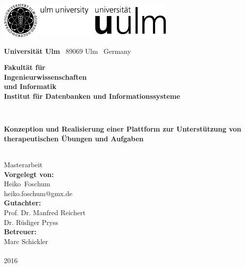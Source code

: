 \documentclass[a4paper,10pt,twoside,openright,DIV=15,BCOR25mm
]{scrbook}
\makeatletter
\newcommand{\fullname}{Heiko~Foschum}
\newcommand{\email}{heiko.foschum@gmx.de}
\newcommand{\titel}{Konzeption und Realisierung  einer \newline Plattform zur Unterstützung von \newline therapeutischen Übungen \newline und Aufgaben}
\newcommand{\jahr}{2016}
\newcommand{\gutachterA}{Prof. Dr. Manfred Reichert}
\newcommand{\gutachterB}{Dr. Rüdiger Pryss}
\newcommand{\betreuer}{Marc Schickler}
\newcommand{\fakultaet}{Ingenieurwissenschaften\\und Informatik}
\newcommand{\institut}{Institut für Datenbanken und Informationssysteme}
\makeatother
\begin{document}
\frontmatter


\thispagestyle{empty}
\begin{addmargin*}[4mm]{-10mm}

\includegraphics[height=1.8cm]{images/unilogo_bild}
\hfill
\includegraphics[height=1.8cm]{images/unilogo_wort}\\[1em]

{\footnotesize
{\bfseries Universität Ulm} \textbar ~89069 Ulm \textbar ~Germany
\hspace*{50mm}\parbox[t]{65mm}{\bfseries Fakultät für\\
\fakultaet\\
\mdseries \institut}\\[2cm]

\parbox{140mm}{\bfseries \huge \titel}\\[0.5em]
{\footnotesize Masterarbeit}\\[3em]

{\footnotesize \bfseries Vorgelegt von:}\\
{\footnotesize \fullname\\\email}\\[2em]
{\footnotesize \bfseries Gutachter:}\\ 
{\footnotesize\gutachterA\\
\gutachterB}\\[2em]
{\footnotesize \bfseries Betreuer:}\\ 
{\footnotesize\betreuer}\\\\
{\footnotesize\jahr}
}
\end{addmargin*}
\end{document}
